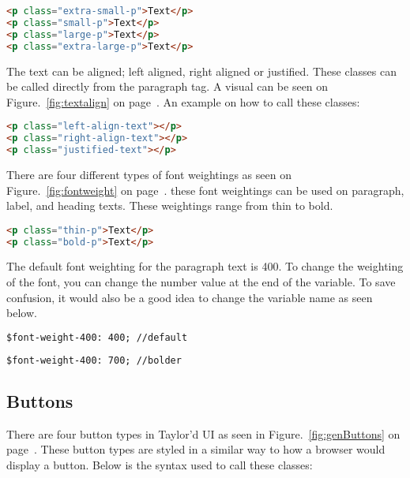 \begin{lstlisting}[language=HTML]
<p class="extra-small-p">Text</p>      
<p class="small-p">Text</p>      
<p class="large-p">Text</p>       
<p class="extra-large-p">Text</p>
\end{lstlisting}

The text can be aligned; left aligned, right aligned or justified. These classes can be called directly from the paragraph tag. A visual can be seen on Figure.~\ref{fig:textalign} on  page~\pageref{fig:textalign}. An example on how to call these classes: 

 \begin{lstlisting}[language=HTML]
<p class="left-align-text"></p>
<p class="right-align-text"></p>
<p class="justified-text"></p>
\end{lstlisting}

There are four different types of font weightings as seen on Figure.~\ref{fig:fontweight} on  page~\pageref{fig:fontweight}. these font weightings can be used on paragraph, label, and heading texts. These weightings range from thin to bold.

\begin{lstlisting}[language=HTML]
<p class="thin-p">Text</p>
<p class="bold-p">Text</p>
\end{lstlisting}

The default font weighting for the paragraph text is 400. To change the weighting of the font, you can change the number value at the end of the variable. To save confusion, it would also be a good idea to change the variable name as seen below.

\begin{lstlisting}[language=HTML]
$font-weight-400: 400; //default
\end{lstlisting}

\begin{lstlisting}[language=HTML]
$font-weight-400: 700; //bolder
\end{lstlisting}

\newpage
\subsection*{Buttons}

There are four button types in Taylor'd UI as seen in Figure.~\ref{fig:genButtons} on  page~\pageref{fig:genButtons}. These button types are styled in a similar way to how a browser would display a button. Below is the syntax used to call these classes: 

